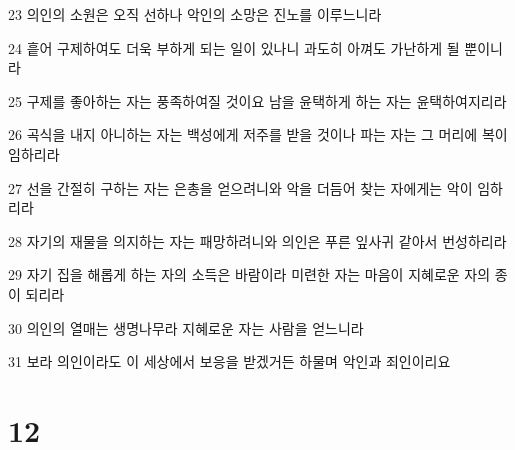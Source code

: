 \par 23 의인의 소원은 오직 선하나 악인의 소망은 진노를 이루느니라
\par 24 흩어 구제하여도 더욱 부하게 되는 일이 있나니 과도히 아껴도 가난하게 될 뿐이니라
\par 25 구제를 좋아하는 자는 풍족하여질 것이요 남을 윤택하게 하는 자는 윤택하여지리라
\par 26 곡식을 내지 아니하는 자는 백성에게 저주를 받을 것이나 파는 자는 그 머리에 복이 임하리라
\par 27 선을 간절히 구하는 자는 은총을 얻으려니와 악을 더듬어 찾는 자에게는 악이 임하리라
\par 28 자기의 재물을 의지하는 자는 패망하려니와 의인은 푸른 잎사귀 같아서 번성하리라
\par 29 자기 집을 해롭게 하는 자의 소득은 바람이라 미련한 자는 마음이 지혜로운 자의 종이 되리라
\par 30 의인의 열매는 생명나무라 지혜로운 자는 사람을 얻느니라
\par 31 보라 의인이라도 이 세상에서 보응을 받겠거든 하물며 악인과 죄인이리요

\chapter{12}


